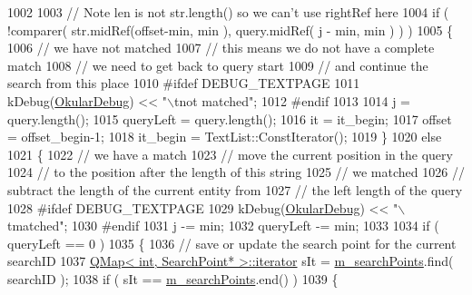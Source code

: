 \begin{DoxyCode}
1002 
1003             \textcolor{comment}{// Note len is not str.length() so we can't use rightRef here}
1004             \textcolor{keywordflow}{if} ( !comparer( str.midRef(offset-min, min ), query.midRef( j - min, min ) ) )
1005             \{
1006                     \textcolor{comment}{// we have not matched}
1007                     \textcolor{comment}{// this means we do not have a complete match}
1008                     \textcolor{comment}{// we need to get back to query start}
1009                     \textcolor{comment}{// and continue the search from this place}
1010 \textcolor{preprocessor}{#ifdef DEBUG\_TEXTPAGE}
1011                     kDebug(\hyperlink{debug__p_8h_af16c6e32a95969dd0605d792ec9807c7}{OkularDebug}) << \textcolor{stringliteral}{"\(\backslash\)tnot matched"};
1012 \textcolor{preprocessor}{#endif}
1013 
1014                     j = query.length();
1015                     queryLeft = query.length();
1016                     it = it\_begin;
1017                     offset = offset\_begin-1;
1018                     it\_begin = TextList::ConstIterator();
1019             \}
1020             \textcolor{keywordflow}{else}
1021             \{
1022                     \textcolor{comment}{// we have a match}
1023                     \textcolor{comment}{// move the current position in the query}
1024                     \textcolor{comment}{// to the position after the length of this string}
1025                     \textcolor{comment}{// we matched}
1026                     \textcolor{comment}{// subtract the length of the current entity from }
1027                     \textcolor{comment}{// the left length of the query}
1028 \textcolor{preprocessor}{#ifdef DEBUG\_TEXTPAGE}
1029                     kDebug(\hyperlink{debug__p_8h_af16c6e32a95969dd0605d792ec9807c7}{OkularDebug}) << \textcolor{stringliteral}{"\(\backslash\)tmatched"};
1030 \textcolor{preprocessor}{#endif}
1031                     j -= min;
1032                     queryLeft -= min;
1033 
1034                     \textcolor{keywordflow}{if} ( queryLeft == 0 )
1035                     \{
1036                         \textcolor{comment}{// save or update the search point for the current searchID}
1037                         \hyperlink{classQMap}{QMap< int, SearchPoint* >::iterator} sIt = 
      \hyperlink{classOkular_1_1TextPagePrivate_a4cd8e4b3be609ba6f03c8c85963d7b6e}{m\_searchPoints}.find( searchID );
1038                         \textcolor{keywordflow}{if} ( sIt == \hyperlink{classOkular_1_1TextPagePrivate_a4cd8e4b3be609ba6f03c8c85963d7b6e}{m\_searchPoints}.end() )
1039                         \{

\end{DoxyCode}
